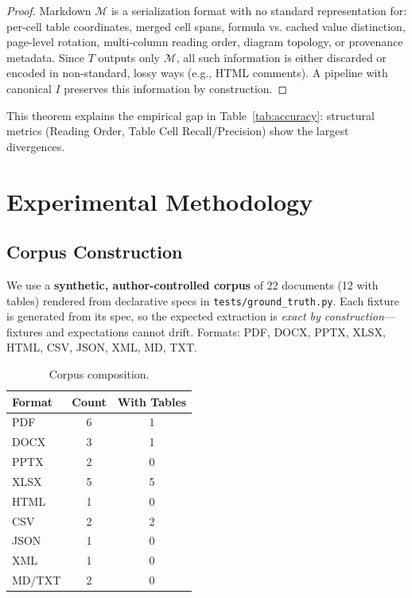 \documentclass[10pt, conference, compsocconf]{IEEEtran}
\theoremstyle{plain}
\begin{document}
\begin{proof}
Markdown $\mathcal{M}$ is a serialization format with no standard representation for: per-cell table coordinates, merged cell spans, formula vs. cached value distinction, page-level rotation, multi-column reading order, diagram topology, or provenance metadata. Since $T$ outputs only $\mathcal{M}$, all such information is either discarded or encoded in non-standard, lossy ways (e.g., HTML comments). A pipeline with canonical $I$ preserves this information by construction.
\end{proof}

This theorem explains the empirical gap in Table~\ref{tab:accuracy}: structural metrics (Reading Order, Table Cell Recall/Precision) show the largest divergences.

\section{Experimental Methodology}
\label{sec:methodology}

\subsection{Corpus Construction}

We use a \textbf{synthetic, author-controlled corpus} of 22 documents (12 with tables) rendered from declarative specs in \texttt{tests/ground\_truth.py}. Each fixture is generated from its spec, so the expected extraction is \textit{exact by construction}---fixtures and expectations cannot drift. Formats: PDF, DOCX, PPTX, XLSX, HTML, CSV, JSON, XML, MD, TXT.

\begin{table}[H]
\centering
\caption{Corpus composition.}
\label{tab:corpus}
\begin{tabular}{@{}lcc@{}}
\toprule
\textbf{Format} & \textbf{Count} & \textbf{With Tables} \\
\midrule
PDF     & 6 & 1 \\
DOCX    & 3 & 1 \\
PPTX    & 2 & 0 \\
XLSX    & 5 & 5 \\
HTML    & 1 & 0 \\
CSV     & 2 & 2 \\
JSON    & 1 & 0 \\
XML     & 1 & 0 \\
MD/TXT  & 2 & 0 \\
\bottomrule
\end{tabular}
\end{table}
\end{document}
